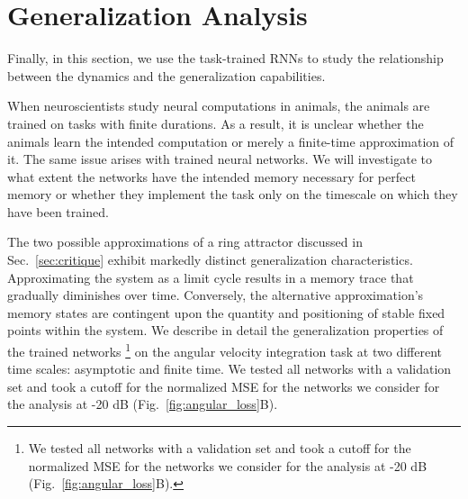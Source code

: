 \documentclass{article} %
\newcounter{ct}
\theoremstyle{definition}
\theoremstyle{remark}
\begin{document}
\section{Generalization Analysis}\label{sec:generalization}

Finally, in this section, we use the task-trained RNNs to study the relationship between the dynamics and the generalization capabilities.

When neuroscientists study neural computations in animals, the animals are trained on tasks with finite durations. As a result, it is unclear whether the animals learn the intended computation or merely a finite-time approximation of it. The same issue arises with trained neural networks.
We will investigate to what extent the networks have the intended memory necessary for perfect memory or whether they implement the task only on the timescale on which they have been trained.


The two possible approximations of a ring attractor discussed in Sec.~\ref{sec:critique} exhibit markedly distinct generalization characteristics.
Approximating the system as a limit cycle results in a memory trace that gradually diminishes over time.
Conversely, the alternative approximation's memory states are contingent upon the quantity and positioning of stable fixed points within the system.
We describe in detail the generalization properties of the trained networks%
\footnote{We tested all networks with a validation set and took a cutoff for the normalized MSE for the networks we consider for the analysis at -20 dB (Fig.~\ref{fig:angular_loss}B).}%
on the angular velocity integration task at two different time scales:  asymptotic and finite time.
We tested all networks with a validation set and took a cutoff for the normalized MSE for the networks we consider for the analysis at -20 dB (Fig.~\ref{fig:angular_loss}B).
\end{document}
